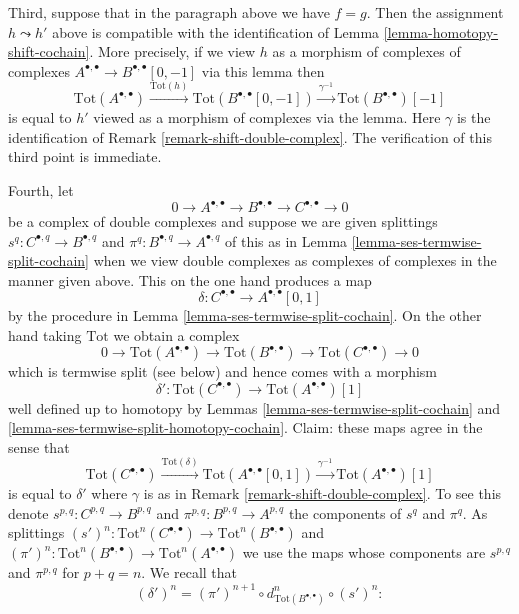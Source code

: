 \begin{remark}
\medskip\noindent
Third, suppose that in the paragraph above we have $f = g$.
Then the assignment $h \leadsto h'$ above is compatible with
the identification of Lemma \ref{lemma-homotopy-shift-cochain}.
More precisely, if we view $h$ as a morphism of complexes
of complexes $A^{\bullet, \bullet} \to B^{\bullet, \bullet}[0, -1]$
via this lemma then
$$
\text{Tot}(A^{\bullet, \bullet})
\xrightarrow{\text{Tot}(h)}
\text{Tot}(B^{\bullet, \bullet}[0, -1])
\xrightarrow{\gamma^{-1}}
\text{Tot}(B^{\bullet, \bullet})[-1]
$$
is equal to $h'$ viewed as a morphism of complexes via the lemma.
Here $\gamma$ is the identification of
Remark \ref{remark-shift-double-complex}.
The verification of this third point is immediate.

\medskip\noindent
Fourth, let
$$
0 \to A^{\bullet, \bullet} \to B^{\bullet, \bullet} \to
C^{\bullet, \bullet} \to 0
$$
be a complex of double complexes and suppose we are given splittings
$s^q : C^{\bullet, q} \to B^{\bullet, q}$ and
$\pi^q : B^{\bullet, q} \to A^{\bullet, q}$
of this as in Lemma \ref{lemma-ses-termwise-split-cochain}
when we view double complexes
as complexes of complexes in the manner given above.
This on the one hand produces a map
$$
\delta : C^{\bullet, \bullet} \longrightarrow A^{\bullet, \bullet}[0, 1]
$$
by the procedure in Lemma \ref{lemma-ses-termwise-split-cochain}.
On the other hand taking $\text{Tot}$ we obtain a complex
$$
0 \to \text{Tot}(A^{\bullet, \bullet}) \to
\text{Tot}(B^{\bullet, \bullet}) \to
\text{Tot}(C^{\bullet, \bullet}) \to 0
$$
which is termwise split (see below) and hence comes with a morphism
$$
\delta' :
\text{Tot}(C^{\bullet, \bullet})
\longrightarrow
\text{Tot}(A^{\bullet, \bullet})[1]
$$
well defined up to homotopy by Lemmas \ref{lemma-ses-termwise-split-cochain}
and \ref{lemma-ses-termwise-split-homotopy-cochain}. Claim:
these maps agree in the sense that
$$
\text{Tot}(C^{\bullet, \bullet})
\xrightarrow{\text{Tot}(\delta)}
\text{Tot}(A^{\bullet, \bullet}[0, 1]) \xrightarrow{\gamma^{-1}}
\text{Tot}(A^{\bullet, \bullet})[1]
$$
is equal to $\delta'$ where $\gamma$ is as in
Remark \ref{remark-shift-double-complex}. To see this denote
$s^{p, q} : C^{p, q} \to B^{p, q}$ and
$\pi^{p, q} : B^{p, q} \to A^{p, q}$ the components of $s^q$ and $\pi^q$.
As splittings
$(s')^n : \text{Tot}^n(C^{\bullet, \bullet}) \to
\text{Tot}^n(B^{\bullet, \bullet})$
and
$(\pi')^n : \text{Tot}^n(B^{\bullet, \bullet}) \to
\text{Tot}^n(A^{\bullet, \bullet})$
we use the maps whose components are $s^{p, q}$ and $\pi^{p, q}$
for $p + q = n$. We recall that
$$
(\delta')^n =
(\pi')^{n + 1} \circ d_{\text{Tot}(B^{\bullet, \bullet})}^n \circ (s')^n :
$$
\end{remark}
